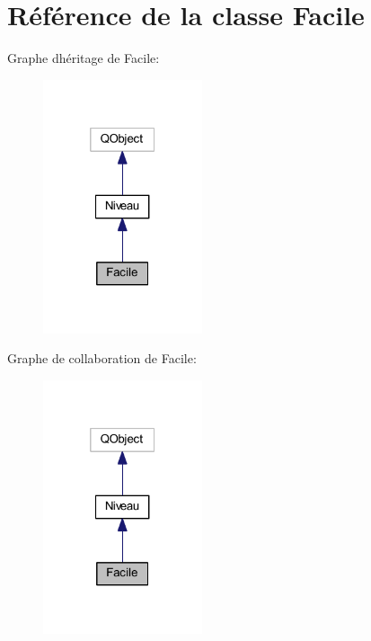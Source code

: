 \hypertarget{class_facile}{}\section{Référence de la classe Facile}
\label{class_facile}


Graphe d\textquotesingle{}héritage de Facile\+:
\nopagebreak
\begin{figure}[H]
\begin{center}
\leavevmode
\includegraphics[width=133pt]{class_facile__inherit__graph}
\end{center}
\end{figure}


Graphe de collaboration de Facile\+:
\nopagebreak
\begin{figure}[H]
\begin{center}
\leavevmode
\includegraphics[width=133pt]{class_facile__coll__graph}
\end{center}
\end{figure}
